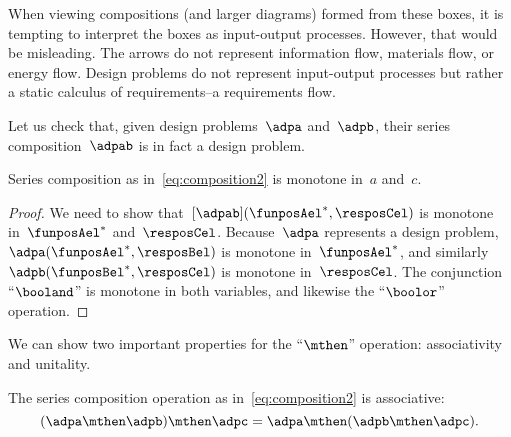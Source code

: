 \begin{remark}
    When viewing compositions (and larger diagrams) formed from these boxes, it is tempting to interpret the boxes as input-output processes.
    However, that would be misleading. The arrows do not represent information flow, materials flow, or energy flow.
    Design problems do not represent input-output processes but rather a static calculus of requirements--a requirements flow.
\end{remark}

Let us check that, given design problems~$\adpa$ and~$\adpb$, their series composition~$\adpab$ is in fact a design problem.
\begin{lemma}
    Series composition as in~\cref{eq:composition2} is monotone in~$a$ and~$c$.
\end{lemma}
\begin{proof}
    We need to show that~$[\adpab](\funposAel^*,\resposCel)$ is monotone in~$\funposAel^*$ and~$\resposCel$.
    Because~$\adpa$ represents a design problem,~$\adpa(\funposAel^*,\resposBel)$ is monotone in~$\funposAel^*$, and similarly~$\adpb(\funposBel^*,\resposCel)$ is monotone in~$\resposCel$.
    The conjunction ``$\booland$'' is monotone in both variables, and likewise the ``$\boolor$'' operation.
\end{proof}

We can show two important properties for the ``$\mthen$'' operation: associativity and unitality.
\begin{lemma}
    The series composition operation as in~\cref{eq:composition2} is associative:
    \begin{equation}
    (\adpa\mthen \adpb)
        \mthen \adpc = \adpa\mthen (\adpb\mthen \adpc).
    \end{equation}
\end{lemma}


